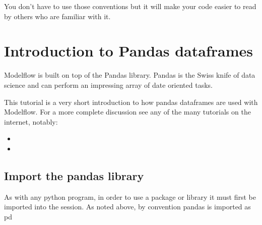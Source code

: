 \documentclass[letterpaper,10pt,english]{jupyterBook}
\begin{document}
\sphinxAtStartPar
You don’t have to use those conventions but it will make your code easier to read by others who are familiar with it.


\section{Introduction to Pandas dataframes}
\label{\detokenize{content/04_PythonEssentials/PythonPandasDataframes:introduction-to-pandas-dataframes}}
\sphinxAtStartPar
Modelflow is built on top of the Pandas library. Pandas is the Swiss knife of data science and can perform an impressing array of date oriented tasks.

\sphinxAtStartPar
This tutorial is a very short introduction to how pandas dataframes are used with Modelflow. For a more complete discussion see any of the many tutorials on the internet, notably:
\begin{itemize}
\item {} 
\sphinxAtStartPar
{}

\item {} 
\sphinxAtStartPar
{}

\end{itemize}


\subsection{Import the pandas library}
\label{\detokenize{content/04_PythonEssentials/PythonPandasDataframes:import-the-pandas-library}}
\sphinxAtStartPar
As with any python program, in order to use a package or library it must first be imported into the session. As noted above, by  convention pandas is imported as pd
\end{document}
